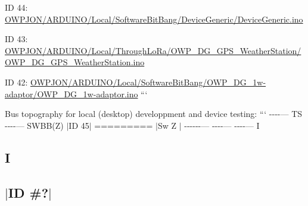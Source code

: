 \begin{DoxyItemize}
\item I\-D 44\-: \hyperlink{ARDUINO_2Local_2SoftwareBitBang_2DeviceGeneric_2DeviceGeneric_8ino}{O\-W\-P\-J\-O\-N/\-A\-R\-D\-U\-I\-N\-O/\-Local/\-Software\-Bit\-Bang/\-Device\-Generic/\-Device\-Generic.\-ino}
\item I\-D 43\-: \hyperlink{OWP__DG__GPS__WeatherStation_8ino}{O\-W\-P\-J\-O\-N/\-A\-R\-D\-U\-I\-N\-O/\-Local/\-Through\-Lo\-Ra/\-O\-W\-P\-\_\-\-D\-G\-\_\-\-G\-P\-S\-\_\-\-Weather\-Station/\-O\-W\-P\-\_\-\-D\-G\-\_\-\-G\-P\-S\-\_\-\-Weather\-Station.\-ino}
\item I\-D 42\-: \hyperlink{OWP__DG__1w-adaptor_8ino}{O\-W\-P\-J\-O\-N/\-A\-R\-D\-U\-I\-N\-O/\-Local/\-Software\-Bit\-Bang/\-O\-W\-P\-\_\-\-D\-G\-\_\-1w-\/adaptor/\-O\-W\-P\-\_\-\-D\-G\-\_\-1w-\/adaptor.\-ino} ```
\end{DoxyItemize}

Bus topography for local (desktop) developpment and device testing\-: ``` -\/-\/-\/-\/--- T\-S -\/-\/-\/-\/--- S\-W\-B\-B(\-Z) $\vert$\-I\-D 45$\vert$ ========= $\vert$\-Sw Z $\vert$ -\/-\/-\/-\/-\/-\/--- -\/-\/-\/-\/--- -\/-\/-\/-\/--- I \subsection*{I }

\subsection*{$\vert$\-I\-D \#?$\vert$ }


